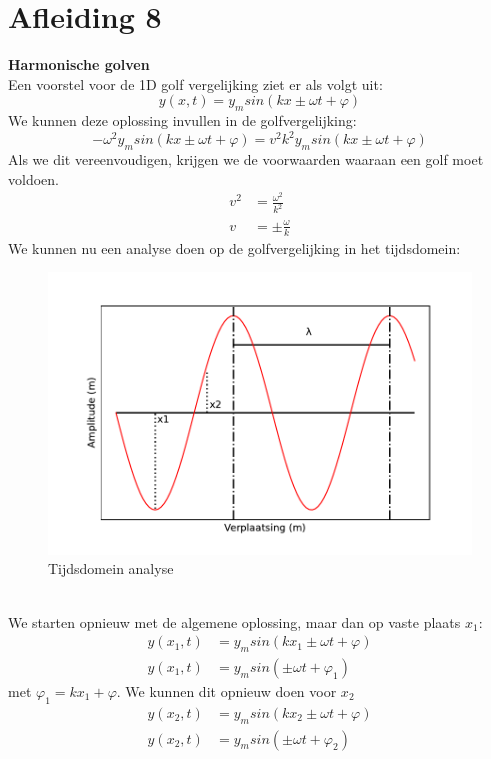 \documentclass[a4paper,kul]{kulakarticle} %
\begin{document}
\section{Afleiding 8}
\textbf{Harmonische golven}\\
Een voorstel voor de 1D golf vergelijking ziet er als volgt uit:
\begin{equation*}
	y(x,t) = y_msin(kx \pm \omega t +\varphi)
\end{equation*}
We kunnen deze oplossing invullen in de golfvergelijking:
\begin{equation*}
	-\omega^2y_msin(kx \pm \omega t +\varphi)=v^2k^2y_msin(kx \pm \omega t +\varphi)
\end{equation*}
Als we dit vereenvoudigen, krijgen we de voorwaarden waaraan een golf moet voldoen.
\begin{align*}
	v^2 & = \frac{\omega^2}{k^2}\\
	v & = \pm\frac{\omega}{k}
\end{align*}
We kunnen nu een analyse doen op de golfvergelijking in het tijdsdomein:\\
\begin{figure}[h]
	\centering
	\includegraphics[width=0.7\linewidth]{tijdsdomein_analyse}
	\caption[Tijdsdomein analyse]{Tijdsdomein analyse}
	\label{fig:tijdsdomein}
\end{figure}\\
We starten opnieuw met de algemene oplossing, maar dan op vaste plaats $x_1$:
\begin{align}
	y(x_1,t) &= y_msin(kx_1 \pm \omega t +\varphi)\\
	\label{eq:tijdsanalyse1}
	y(x_1,t) &= y_msin(\pm \omega t +\varphi_1)
\end{align}
met $\varphi_1 = kx_1 +\varphi$. We kunnen dit opnieuw doen voor $x_2$
\begin{align}
	y(x_2,t) &= y_msin(kx_2 \pm \omega t +\varphi)\\
	\label{eq:tijdsanalyse2}
	y(x_2,t) &= y_msin(\pm \omega t +\varphi_2)
\end{align}
\end{document}
